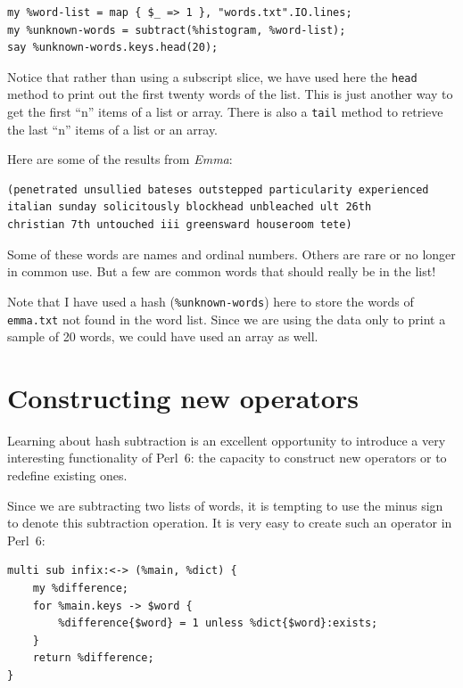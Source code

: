 \begin{verbatim}
my %word-list = map { $_ => 1 }, "words.txt".IO.lines;
my %unknown-words = subtract(%histogram, %word-list);
say %unknown-words.keys.head(20);
\end{verbatim}
%
Notice that rather than using a subscript slice, we have used 
here the {\tt head} method to print out the first twenty words of 
the list. This is just another way to get the first ``n'' items 
of a list or array. There is also a {\tt tail} method to 
retrieve the last ``n'' items of a list or an array.

Here are some of the results from {\em Emma}:

\begin{verbatim}
(penetrated unsullied bateses outstepped particularity experienced 
italian sunday solicitously blockhead unbleached ult 26th 
christian 7th untouched iii greensward houseroom tete)
\end{verbatim}
%
Some of these words are names and ordinal numbers.  Others 
are rare or no longer in common use.  But a few are common
words that should really be in the list!

Note that I have used a hash (\verb'%unknown-words') here to 
store the words of \verb'emma.txt' not found in the word list. 
Since we are using the data only to print a sample of 20 words, 
we could have used an array as well.

\section{Constructing new operators}

\label{operator_construction}

Learning about hash subtraction is an excellent 
opportunity to introduce a very interesting functionality of 
Perl~6: the capacity to construct new operators or to 
redefine existing ones.

Since we are subtracting two lists of words, it is tempting to 
use the minus sign to denote this subtraction operation. It  
is very easy to create such an operator in Perl~6:

\begin{verbatim}
multi sub infix:<-> (%main, %dict) {
	my %difference;
	for %main.keys -> $word {
		%difference{$word} = 1 unless %dict{$word}:exists;
	}
	return %difference;
}
\end{verbatim}

